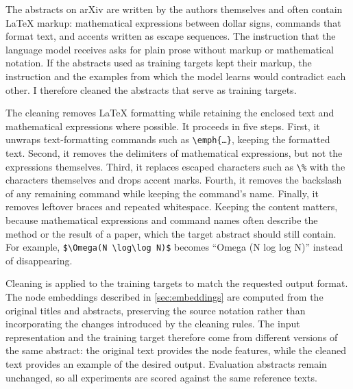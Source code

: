 The abstracts on arXiv are written by the authors themselves and often contain LaTeX markup: mathematical expressions between dollar signs, commands that format text, and accents written as escape sequences. The instruction that the language model receives asks for plain prose without markup or mathematical notation. If the abstracts used as training targets kept their markup, the instruction and the examples from which the model learns would contradict each other. I therefore cleaned the abstracts that serve as training targets.

The cleaning removes LaTeX formatting while retaining the enclosed text and mathematical expressions where possible. It proceeds in five steps. First, it unwraps text-formatting commands such as \texttt{\textbackslash emph\{\ldots\}}, keeping the formatted text. Second, it removes the delimiters of mathematical expressions, but not the expressions themselves. Third, it replaces escaped characters such as \texttt{\textbackslash\%} with the characters themselves and drops accent marks. Fourth, it removes the backslash of any remaining command while keeping the command's name. Finally, it removes leftover braces and repeated whitespace. Keeping the content matters, because mathematical expressions and command names often describe the method or the result of a paper, which the target abstract should still contain. For example, \texttt{\$\textbackslash Omega(N \textbackslash log\textbackslash log N)\$} becomes ``Omega (N log log N)'' instead of disappearing.

Cleaning is applied to the training targets to match the requested output format. The node embeddings described in \autoref{sec:embeddings} are computed from the original titles and abstracts, preserving the source notation rather than incorporating the changes introduced by the cleaning rules. The input representation and the training target therefore come from different versions of the same abstract: the original text provides the node features, while the cleaned text provides an example of the desired output. Evaluation abstracts remain unchanged, so all experiments are scored against the same reference texts.
